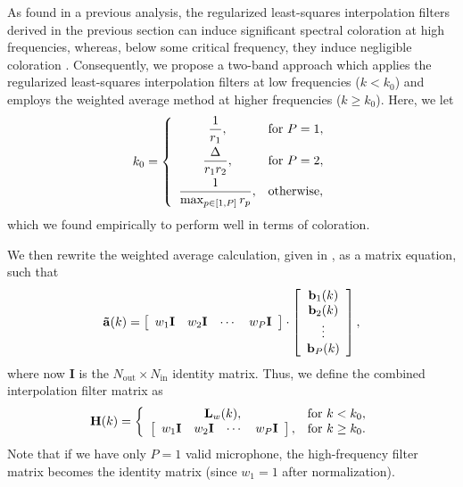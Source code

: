 As found in a previous analysis, the regularized least-squares interpolation filters derived in the previous section can induce significant spectral coloration at high frequencies, whereas, below some critical frequency, they induce negligible coloration \citep[cf.~Fig.~4b]{TylkaChoueiri2016}.
Consequently, we propose a two-band approach which applies the regularized least-squares interpolation filters at low frequencies ($k < k_0$) and employs the weighted average method at higher frequencies ($k \geq k_0$).
Here, we let
\begin{equation}\label{eq:08_Proposed_Method:Hybrid_XO_Freq}
k_0 = \left\{
  \begin{array}{c l}
  \displaystyle \frac{1}{r_1}, & \text{for } P = 1,\\[8pt]
  \displaystyle \frac{\Delta}{r_1 r_2}, & \text{for } P = 2,\\[8pt]
  \displaystyle \frac{1}{\max_{p\in[1,P]} r_p}, & \text{otherwise},
  \end{array} \right.
\end{equation}
which we found empirically to perform well in terms of coloration.

We then rewrite the weighted average calculation, given in , as a matrix equation, such that
\begin{equation}
\mathbf{\tilde{a}}(k) = 
    \left[ \begin{array}{c c c c}
    w_1 \mathbf{I} & w_2 \mathbf{I} & \cdots & w_P \mathbf{I}
    \end{array} \right]
\cdot
     \left[ \begin{array}{c}
    \mathbf{b}_1(k)\\
    \mathbf{b}_2(k)\\
    \vdots\\
    \mathbf{b}_P(k)
    \end{array} \right],
\end{equation}
where now $\mathbf{I}$ is the $N_\textrm{out} \times N_\textrm{in}$ identity matrix. %
Thus, we define the combined interpolation filter matrix as
\begin{equation}\label{eq:08_Proposed_Method:HybridFilters}
\mathbf{H}(k) = \left\{
  \begin{array}{c l}
  \mathbf{L}_w(k), & \textrm{for } k < k_0, \\
  \left[
    \begin{array}{c c c c}
    w_1 \mathbf{I} & w_2 \mathbf{I} & \cdots & w_P \mathbf{I}
    \end{array}
  \right], & \textrm{for } k \geq k_0.
  \end{array} \right.
\end{equation}
Note that if we have only $P = 1$ valid microphone, the high-frequency filter matrix becomes the identity matrix (since $w_1 = 1$ after normalization).

